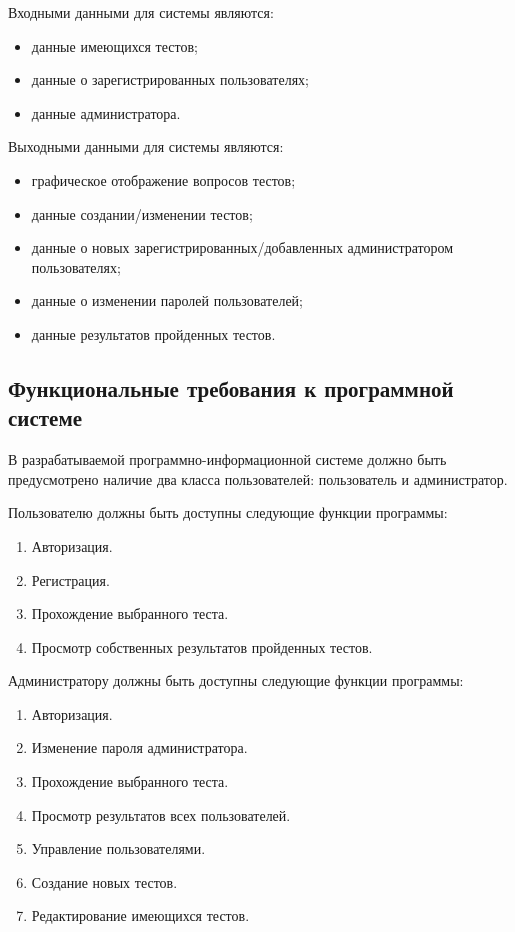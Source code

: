 Входными данными для системы являются:
\begin{itemize}
    \item данные имеющихся тестов;
    \item данные о зарегистрированных пользователях;
    \item данные администратора.
\end{itemize}

Выходными данными для системы являются:
\begin{itemize}
	\item графическое отображение вопросов тестов;
	\item данные создании/изменении тестов;
	\item данные о новых зарегистрированных/добавленных администратором пользователях;
	\item данные о изменении паролей пользователей;
	\item данные результатов пройденных тестов.
\end{itemize}

\subsection{Функциональные требования к программной системе}

В разрабатываемой программно-информационной системе должно
быть предусмотрено наличие два класса пользователей: пользователь и администратор.

Пользователю должны быть доступны следующие функции программы:
\begin{enumerate}
	\item Авторизация.
	\item Регистрация.
	\item Прохождение выбранного теста.
	\item Просмотр собственных результатов пройденных тестов.
\end{enumerate}

Администратору должны быть доступны следующие функции программы:
\begin{enumerate}
	\item Авторизация.
	\item Изменение пароля администратора.
	\item Прохождение выбранного теста.
	\item Просмотр результатов всех пользователей.
	\item Управление пользователями.
	\item Создание новых тестов.
	\item Редактирование имеющихся тестов.
\end{enumerate}


